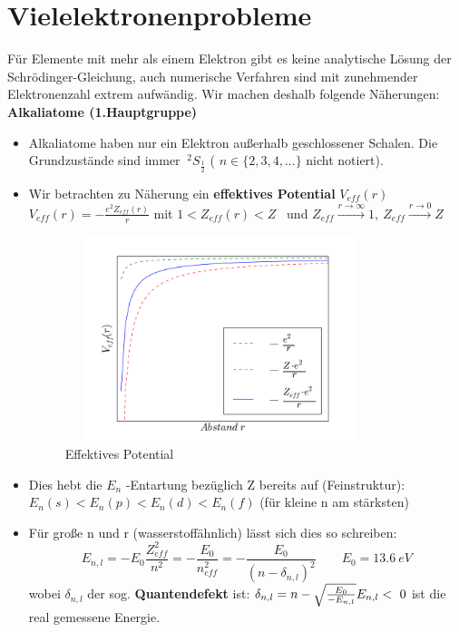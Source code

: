 \documentclass[Ex4_Zusammenfassung.tex]{subfiles}
\begin{document}
\section{Vielelektronenprobleme} 
Für Elemente mit mehr als einem Elektron gibt es keine analytische Lösung der Schrödinger-Gleichung, auch numerische Verfahren sind mit zunehmender Elektronenzahl extrem aufwändig. Wir machen deshalb folgende Näherungen:
\textbf{Alkaliatome (1.Hauptgruppe)} \newline 
\begin{itemize}
\item Alkaliatome haben nur ein Elektron außerhalb geschlossener Schalen. Die Grundzustände sind immer $ \ ^{2}S_{\frac{1}{2}} $ ( $ n  \in \{2,3,4,...\} $ nicht notiert).
\item Wir betrachten zu Näherung ein \textbf{effektives Potential} $ V_{eff}(r) $ \newline \newline
 $ V_{eff}(r) = - \frac{e^2 Z_{eff}(r)}{r} $ mit $ 1 < Z_{eff}(r) < Z $ \  und  $ Z_ {eff} \stackrel{r\rightarrow \infty}{\rightarrow} 1, \ Z_{eff} \stackrel{r \rightarrow 0}{\rightarrow} Z $
 
\begin{figure}[h]
\centering
\includegraphics[height= 6cm, width=9cm]{effpot.png}
\caption{ Effektives Potential }
\end{figure}
 \item Dies hebt die $ E_n $ -Entartung bezüglich Z bereits auf (Feinstruktur): \newline
$ E_n(s) < E_n(p) < E_n(d) < E_n(f)$ (für kleine n am stärksten)
\item Für große n und r (wasserstoffähnlich) lässt sich dies so schreiben: 
 	\begin{equation}
 	E_{n,l} = -E_0 \frac{Z_{eff}^2}{n^2} = - \frac{E_0}{n_{eff}^2} = - \frac{E_0}{(n-\delta_{n,l})^2} 			\qquad E_0 = 13.6 \  eV 
 	\end{equation}
 wobei $\delta_{n,l} $ der sog. \textbf{Quantendefekt} ist: $ \delta_{n,l} = n - \sqrt{\frac{E_0}{-E_{n,l}}} \newline  E_{n,l} <\  0  $ ist die real gemessene Energie. 

\end{itemize}
\end{document}
